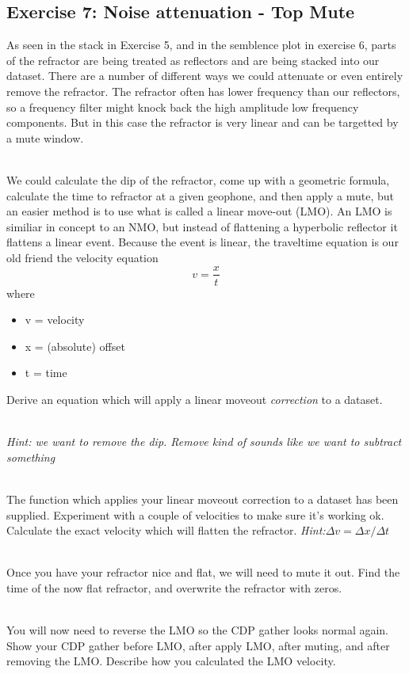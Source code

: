 \subsection*{Exercise 7: Noise attenuation - Top Mute}
As seen in the stack in Exercise 5, and in the semblence plot in exercise 6, parts of the refractor are being treated as reflectors and are being stacked into our dataset.  There are a number of different ways we could attenuate or even entirely remove the refractor.  The refractor often has lower frequency than our reflectors, so a frequency filter might knock back the high amplitude low frequency components. But in this case the refractor is very linear and can be targetted by a mute window.
\par~\\
We could calculate the dip of the refractor, come up with a geometric formula, calculate the time to refractor at a given geophone, and then apply a mute, but an easier method is to use what is called a linear move-out (LMO).  An LMO is similiar in concept to an NMO, but instead of flattening a hyperbolic reflector it flattens a linear event.  Because the event is linear, the traveltime equation is our old friend the velocity equation
\[ v = \frac{x}{t} \]
where
\begin{itemize}
\item v = velocity
\item x = (absolute) offset
\item t = time
\end{itemize}
Derive an equation which will apply a linear moveout \emph{correction} to a dataset.  
\par~\\
\emph{Hint: we want to remove the dip.  Remove kind of sounds like we want to subtract something}
\par~\\
The function which applies your linear moveout correction to a dataset has been supplied. Experiment with a couple of velocities to make sure it's working ok.  Calculate the exact velocity which will flatten the refractor.
\emph{Hint:$\Delta v = \Delta x/\Delta t$}
\par~\\
Once you have your refractor nice and flat, we will need to mute it out.  Find the time of the now flat refractor, and overwrite the refractor with zeros. 
\par~\\
You will now need to reverse the LMO so the CDP gather looks normal again.  Show your CDP gather before LMO, after apply LMO, after muting, and after removing the LMO. Describe how you calculated the LMO velocity.

